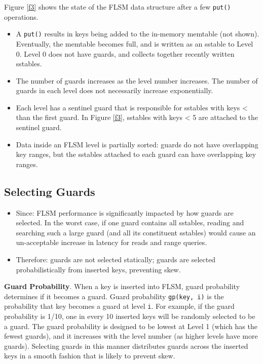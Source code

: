 \documentclass[11pt]{article}
\begin{document}
\begin{examplle}[]
Figure \ref{f3} shows the state of the FLSM data structure after a few \texttt{put()} operations.
\begin{itemize}
\item A \texttt{put()} results in keys being added to the in-memory memtable (not shown). Eventually, the memtable
becomes full, and is written as an sstable to Level 0. Level 0 does not have guards, and collects
together recently written sstables.
\item The number of guards increases as the level number increases. The number of guards in each level
does not necessarily increase exponentially.
\item Each level has a sentinel guard that is responsible for sstables with keys < than the first guard.
In Figure \ref{f3}, sstables with keys < 5 are attached to the sentinel guard.
\item Data inside an FLSM level is partially sorted: guards do not have overlapping key ranges, but the
sstables attached to each guard can have overlapping key ranges.
\end{itemize}
\end{examplle}
\subsection{Selecting Guards}
\label{sec:org7bce243}
\begin{itemize}
\item Since: FLSM performance is significantly impacted by how guards are selected. In the worst case, if
one guard contains all sstables, reading and searching such a large guard (and all its constituent sstables) would cause an un-acceptable increase in latency for reads and range queries.
\item Therefore: guards are not selected statically; guards are selected probabilistically from inserted
keys, preventing skew.
\end{itemize}

\textbf{Guard Probability}. When a key is inserted into FLSM, guard probability determines if it becomes a
guard. Guard probability \texttt{gp(key, i)} is the probability that key becomes a guard at level \texttt{i}. For
example, if the guard probability is 1/10, one in every 10 inserted keys will be randomly selected to
be a guard. The guard probability is designed to be lowest at Level 1 (which has the fewest guards),
and it increases with the level number (as higher levels have more guards). Selecting guards in this
manner distributes guards across the inserted keys in a smooth fashion that is likely to prevent skew.
\end{document}

